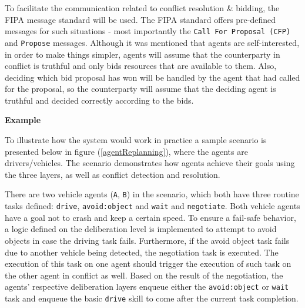 \documentclass[main.tex]{subfiles}
\begin{document}
To facilitate the communication related to conflict resolution \& bidding, the FIPA message
standard will be used.  The FIPA standard offers pre-defined messages for such situations -
most importantly the \texttt{Call For Proposal (CFP)} and \texttt{Propose} messages. Although
it was mentioned that agents are self-interested, in order to make things simpler, agents will
assume that the counterparty in conflict is truthful and only bids resources that are
available to them. Also, deciding which bid proposal has won will be handled by the agent that
had called for the proposal, so the counterparty will assume that the deciding agent is
truthful and decided correctly according to the bids. 

\textbf{Example}

To illustrate how the system would work in practice a sample scenario is presented below in
figure (\ref{agentReplanning}), where the agents are drivers/vehicles. The scenario demonstrates 
how agents achieve their goals using the three layers, as well as conflict detection and resolution.

There are two vehicle agents (\texttt{A}, \texttt{B}) in the scenario, which both have three routine tasks defined:
\texttt{drive}, \texttt{avoid:object} and \texttt{wait} and \texttt{negotiate}. Both vehicle
agents have a goal not to crash and keep a certain speed. To ensure a fail-safe behavior, 
a logic defined on the deliberation level is implemented to attempt to avoid objects in case the driving task
fails. Furthermore, if the avoid object task fails due to another vehicle being detected, the negotiation 
task is executed. The execution of this task on one agent should trigger the execution of such task on the 
other agent in conflict as well. Based on the result of the negotiation, the agents' respective 
deliberation layers enqueue either the \texttt{avoid:object} or \texttt{wait} task and enqueue the 
basic \texttt{drive} skill to come after the current task completion.
\end{document}
